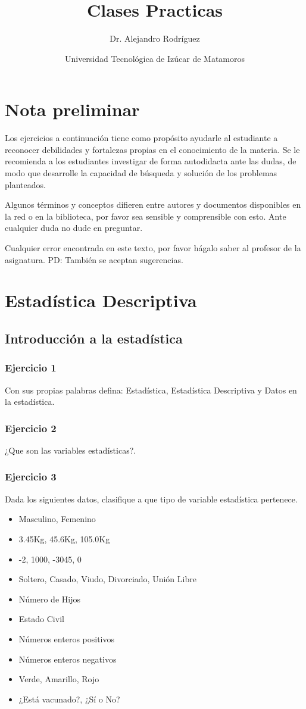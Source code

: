 \documentclass[11pt,letterpaper]{report}
\author{Dr. Alejandro Rodr\'iguez}
\title{Clases Practicas}
\date{Universidad Tecnol\'ogica de Iz\'ucar de Matamoros}
\begin{document}
  \maketitle
  \newpage

  \chapter*{Nota preliminar}
    Los ejercicios a continuación tiene como propósito ayudarle al estudiante a reconocer debilidades y fortalezas propias en el conocimiento de la materia. Se le recomienda a los estudiantes investigar de forma autodidacta ante las dudas, de modo que desarrolle la capacidad de búsqueda y solución de los problemas planteados.

    Algunos términos y conceptos difieren entre autores y documentos disponibles en la red o en la biblioteca, por favor sea sensible y comprensible con esto. Ante cualquier duda no dude en preguntar.

    Cualquier error encontrada en este texto, por favor hágalo saber al profesor de la asignatura.
    PD: También se aceptan sugerencias.


  \chapter{Estad\'istica Descriptiva}
    \section{Introducción a la estadística}

      \subsection*{Ejercicio 1}
        Con sus propias palabras defina: Estadística, Estadística Descriptiva y Datos en la estadística.
      \subsection*{Ejercicio 2}
        ¿Que son las variables estadísticas?.
      \subsection*{Ejercicio 3}
         Dada los siguientes datos, clasifique a que tipo de variable estadística pertenece.
        \begin{itemize}
      	  \item Masculino, Femenino
          \item 3.45Kg, 45.6Kg, 105.0Kg
          \item -2, 1000, -3045, 0
          \item Soltero, Casado, Viudo, Divorciado, Unión Libre
          \item Número de Hijos
          \item Estado Civil
          \item Números enteros positivos
          \item Números enteros negativos
          \item Verde, Amarillo, Rojo
          \item ¿Está vacunado?, ¿Sí o No?
        \end{itemize}
\end{document}

